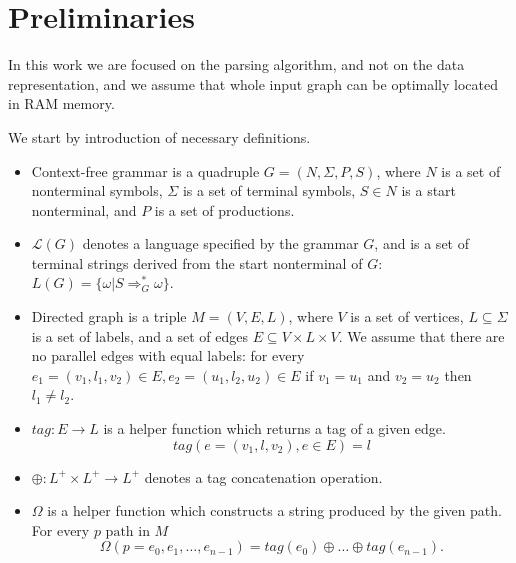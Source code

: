 \section{Preliminaries}

In this work we are focused on the parsing algorithm, and not on the data representation, and we assume that whole input graph can be optimally located in RAM memory.

We start by introduction of necessary definitions.
\begin{itemize}
  \item Context-free grammar is a quadruple $G=(N, \Sigma, P, S)$, where $N$ is a set of nonterminal symbols, $\Sigma$ is a set of terminal symbols, $S \in N$ is a start nonterminal, and $P$ is a set of productions. 
  \item $\mathcal{L}(G)$ denotes a language specified by the grammar $G$, and is a set of terminal strings derived from the start nonterminal of $G$: $L(G) = \{\omega | S \Rightarrow_{G}^{*} \omega\}$.
  \item Directed graph is a triple $M = (V,E,L)$, where $V$ is a set of vertices, $L \subseteq \Sigma$ is a set of labels, and a set of edges $E\subseteq V\times L\times V$. 
  We assume that there are no parallel edges with equal labels: for every $e_1=(v_1,l_1,v_2) \in E, e_2=(u_1,l_2,u_2) \in E$ if $v_1 = u_1$ and $v_2 = u_2$ then $l_1 \neq l_2$.
  \item $tag: E \rightarrow L$ is a helper function which returns a tag of a given edge. $$tag(e = (v_1,l,v_2), e \in E) = l$$
  \item $\oplus: L^+ \times L^+ \rightarrow L^+$ denotes a tag concatenation operation.
  \item $\Omega$ is a helper function which constructs a string produced by the given path. For every $p \text{ path in } M$
  $$ \Omega(p = e_{0},e_{1},\dots,e_{n-1}) = tag (e_{0}) \oplus \dots \oplus tag (e_{n-1}).$$
\end{itemize}

